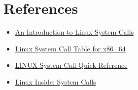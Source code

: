 \documentclass{article}
\begin{document}
\section*{References}
\begin{itemize}
	\item \href{https://hvnsweeting.github.io/syscall.html}{An Introduction to Linux System Calls}
	\item \href{https://blog.rchapman.org/posts/Linux_System_Call_Table_for_x86_64/}{Linux System Call Table for x86\_64}
	\item \href{http://www.cheat-sheets.org/saved-copy/Linux_Syscall_quickref.pdf}{LINUX System Call Quick Reference}
	\item \href{https://0xax.gitbooks.io/linux-insides/content/SysCall/}{Linux Inside: System Calls}
\end{itemize}
\end{document}
